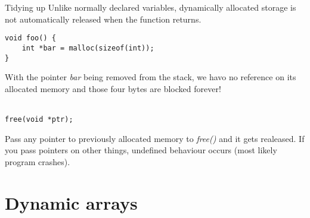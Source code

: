 \begin{frame}[fragile]{Tidying up}
	Unlike normally declared variables, dynamically allocated storage is not automatically released when the function returns.
	\begin{lstlisting}
void foo() {
	int *bar = malloc(sizeof(int));
}
\end{lstlisting}
	With the pointer \textit{bar} being removed from the stack, we havo no reference on its allocated memory and those four bytes are blocked forever! \\
	\ \\
	\begin{lstlisting}[numbers=none]
free(void *ptr);
\end{lstlisting}
	Pass any pointer to previously allocated memory to \textit{free()} and it gets realeased. If you pass pointers on other things, undefined behaviour occurs (most likely program crashes).
\end{frame}

\section{Dynamic arrays}
